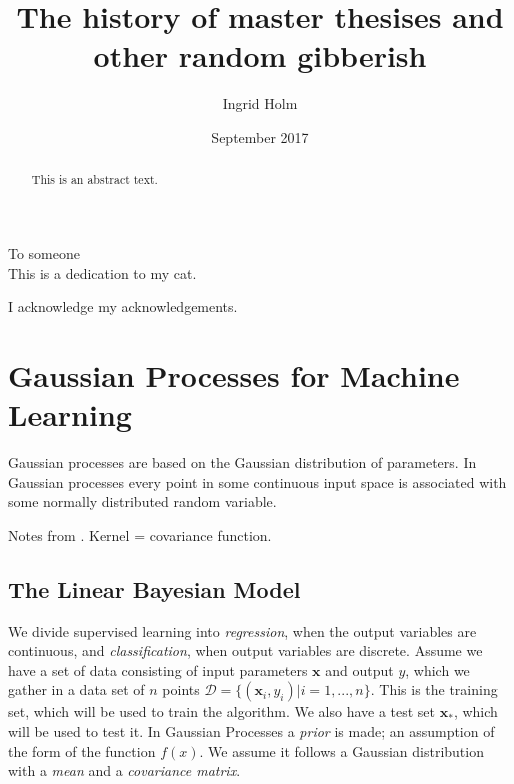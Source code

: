 \documentclass[twoside,english]{uiofysmaster}
\begin{document}
\title{The history of master thesises and other random gibberish}
\author{Ingrid Holm}
\date{September 2017}

\maketitle

\begin{abstract}
This is an abstract text.
\end{abstract}

\begin{dedication}
  To someone
  \\\vspace{12pt}
  This is a dedication to my cat.
\end{dedication}

\begin{acknowledgements}
  I acknowledge my acknowledgements.
\end{acknowledgements}

\tableofcontents




\chapter{Gaussian Processes for Machine Learning}

Gaussian processes are based on the Gaussian distribution of parameters. In Gaussian processes every point in some continuous input space is associated with some normally distributed random variable.

Notes from \cite{rasmussen2006gaussian}. Kernel = covariance function. 

\section{The Linear Bayesian Model}


We divide supervised learning into \textit{regression}, when the output variables are continuous, and \textit{classification}, when output variables are discrete. Assume we have a set of data consisting of input parameters $\textbf{x}$ and output $y$, which we gather in a data set of $n$ points $\mathcal{D}=\{(\textbf{x}_i, y_i)| i=1,...,n\}$. This is the training set, which will be used to train the algorithm. We also have a test set $\textbf{x}_*$, which will be used to test it. In Gaussian Processes a \textit{prior} is made; an assumption of the form of the function $f(x)$. We assume it follows a Gaussian distribution with a \textit{mean} and a \textit{covariance matrix}.
\end{document}
